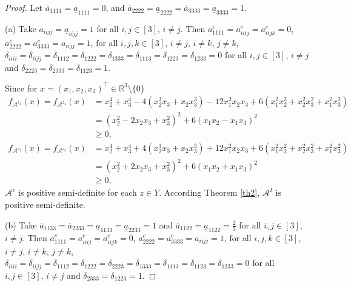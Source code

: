\documentclass[twoside]{article}
\begin{document}
\begin{proof}
Let $\overline{a}_{1111}=\underline{a}_{1111}=0$, and $\overline{a}_{2222}=\underline{a}_{2222}=\overline{a}_{3333}=\underline{a}_{3333}=1$.

(a) Take $\overline{a}_{iijj}=\underline{a}_{iijj}=1$ for all $i,j\in[3]$, $i\neq j$. Then $a^c_{1111}=a^c_{iiij}=a^c_{iijk}=0$, $a^c_{2222}=a^c_{3333}=a_{iijj}=1$, for all $i,j,k\in[3]$, $i\neq j$, $i\neq k$, $j\neq k$, $\delta_{iiii}=\delta_{iijj}=\delta_{1112}=\delta_{1222}=\delta_{1333}=\delta_{1113}=\delta_{1223}=\delta_{1233}=0$ for all $i,j\in[3]$, $i\neq j$ and $\delta_{2223}=\delta_{2333}=\delta_{1123}=1$.

Since for $x=(x_1,x_2,x_3)^{\top}\in\mathbb{R}^3\setminus\{0\}$
\begin{align*}
  f_{\mathcal{A}^{z_1}}(x)=f_{\mathcal{A}^{z_4}}(x) &=x_2^4+x_3^4-4(x_2^3x_3+x_2x_3^3)-12x_1^2x_2x_3+6(x_1^2x_2^2+x_2^2x_3^2+x_1^2x_3^2)\\
  &=(x_2^2-2x_2x_3+x_3^2)^2+6(x_1x_2-x_1x_3)^2\\
  &\geq0,
\end{align*}
\begin{align*}
  f_{\mathcal{A}^{z_2}}(x)=f_{\mathcal{A}^{z_3}}(x) &=x_2^4+x_3^4+4(x_2^3x_3+x_2x_3^3)+12x_1^2x_2x_3+6(x_1^2x_2^2+x_2^2x_3^2+x_1^2x_3^2)\\
  &=(x_2^2+2x_2x_3+x_3^2)^2+6(x_1x_2+x_1x_3)^2\\
  &\geq0,
\end{align*}
$\mathcal{A}^z$ is positive semi-definite for each $z\in Y$. According Theorem \ref{th2}, $\mathcal{A}^I$ is positive semi-definite.

(b) Take $\overline{a}_{1133}= \overline{a}_{2233}=\underline{a}_{1133}=\underline{a}_{2233}=1$ and  $\overline{a}_{1122}=\underline{a}_{1122}=\frac{2}{3}$ for all $i,j\in[3]$, $i\neq j$. Then $a^c_{1111}=a^c_{iiij}=a^c_{iijk}=0$, $a^c_{2222}=a^c_{3333}=a_{iijj}=1$, for all $i,j,k\in[3]$, $i\neq j$, $i\neq k$, $j\neq k$, $\delta_{iiii}=\delta_{iijj}=\delta_{1112}=\delta_{1222}=\delta_{2223}=\delta_{1333}=\delta_{1113}=\delta_{1123}=\delta_{1233}=0$ for all $i,j\in[3]$, $i\neq j$ and $\delta_{2333}=\delta_{1223}=1$.


\end{proof}
\end{document}
